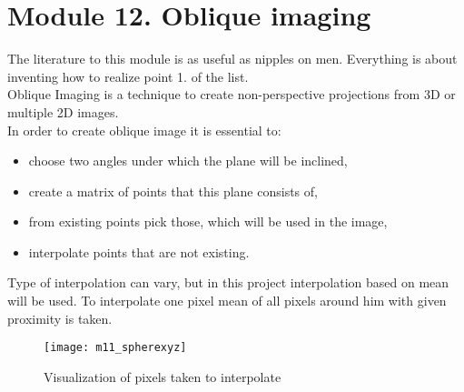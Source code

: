 \section{Module 12. Oblique imaging}

\indent The literature to this module is as useful as nipples on
men. Everything is about inventing how to realize point 1. of the
list. \\
 \indent Oblique Imaging is a technique to create non-perspective
projections from 3D or multiple 2D images.\\

\indent In order to create oblique image it is essential to: 
\begin{itemize}
\item choose two angles under which the plane will be inclined, 
\item create a matrix of points that this plane consists of, 
\item from existing points pick those, which will be used in the image, 
\item interpolate points that are not existing. 
\end{itemize}
\indent Type of interpolation can vary, but in this project interpolation
based on mean will be used. To interpolate one pixel mean of all pixels
around him with given proximity is taken.

\begin{figure}[H]
\centering{}\texttt{[image: m11\_spherexyz]}\caption{Visualization of pixels taken to interpolate}
\label{fig:m11_spherexyz } 
\end{figure}